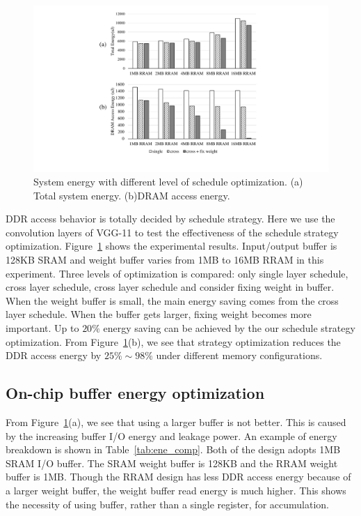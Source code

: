\begin{figure}[t]
  \centering
  \includegraphics[width=1\columnwidth]{fig/opt_res.pdf}
  \caption{System energy with different level of schedule optimization. (a) Total system energy. (b)DRAM access energy.}
  \label{fig:exp_strategy}
\end{figure}

DDR access behavior is totally decided by schedule strategy. Here we use the convolution layers of VGG-11 to test the effectiveness of the schedule strategy optimization. Figure~\ref{fig:exp_strategy} shows the experimental results. Input/output buffer is 128KB SRAM and weight buffer varies from 1MB to 16MB RRAM in this experiment. Three levels of optimization is compared: only single layer schedule, cross layer schedule, cross layer schedule and consider fixing weight in buffer. When the weight buffer is small, the main energy saving comes from the cross layer schedule. When the buffer gets larger, fixing weight becomes more important. Up to $20\%$ energy saving can be achieved by the our schedule strategy optimization. From Figure~\ref{fig:exp_strategy}(b), we see that strategy optimization reduces the DDR access energy by $25\%\sim 98\%$ under different memory configurations.

\subsection{On-chip buffer energy optimization}
From Figure~\ref{fig:exp_strategy}(a), we see that using a larger buffer is not better. This is caused by the increasing buffer I/O energy and leakage power. An example of energy breakdown is shown in Table~\ref{tab:ene_comp}. Both of the design adopts 1MB SRAM I/O buffer. The SRAM weight buffer is 128KB and the RRAM weight buffer is 1MB. Though the RRAM design has less DDR access energy because of a larger weight buffer, the weight buffer read energy is much higher. This shows the necessity of using buffer, rather than a single register, for accumulation. 

